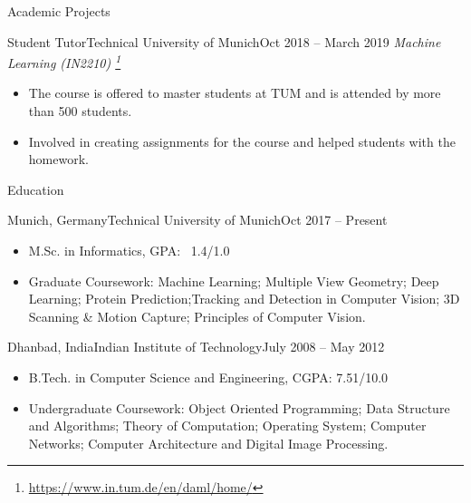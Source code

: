 \documentclass[]{mcdowellcv}
\begin{document}
\begin{cvsection}{Academic Projects}
    \begin{cvsubsection}{Student Tutor}{Technical University of Munich}{Oct 2018 -- March 2019}
        \textit{Machine Learning (IN2210) \footnote{\href{https://www.in.tum.de/en/daml/home/}{https://www.in.tum.de/en/daml/home/}}}
            \begin{itemize}
                \item The course is offered to master students at TUM and is attended by more than 500 students.
                \item Involved in creating assignments for the course and helped students with the homework.
            \end{itemize}
        \end{cvsubsection}

    \end{cvsection}

    \begin{cvsection}{Education}
        \begin{cvsubsection}{Munich, Germany}{Technical University of Munich}{Oct 2017 -- Present}
            \begin{itemize}
                \item M.Sc. in Informatics, GPA: ~1.4/1.0
                \item Graduate Coursework: Machine Learning; Multiple View Geometry; Deep Learning; Protein Prediction;Tracking and Detection in Computer Vision; 3D Scanning \& Motion Capture; Principles of Computer Vision.
            \end{itemize}
        \end{cvsubsection}
        \begin{cvsubsection}{Dhanbad, India}{Indian Institute of Technology}{July 2008 -- May 2012}
            \begin{itemize}
                \item B.Tech. in Computer Science and Engineering,  CGPA: 7.51/10.0
                \item Undergraduate Coursework: Object Oriented Programming; Data Structure and Algorithms; Theory of Computation; Operating System; Computer Networks; Computer Architecture and Digital Image Processing.
            \end{itemize}
        \end{cvsubsection}
    \end{cvsection}
\end{document}
